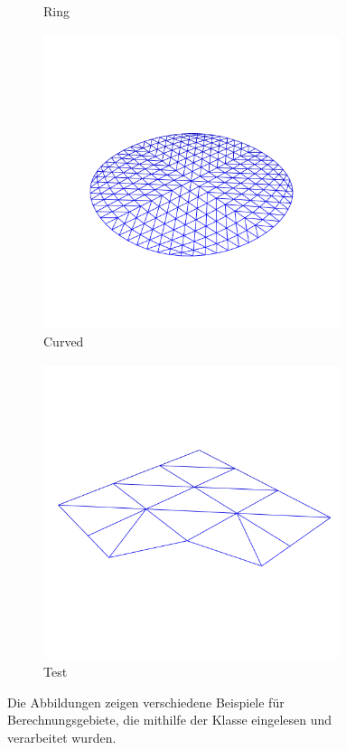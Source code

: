 \documentclass[crop=false,10pt,ngerman]{standalone}
\begin{document}
\begin{figure}
\begin{subfigure}[b]{0.24\textwidth}
          \caption{Ring}
        \end{subfigure}
        \begin{subfigure}[b]{0.24\textwidth}
          \center
          \includegraphics[trim={0 0 0 2cm},clip,width=0.95\textwidth]{images/model-circle-0.png}
          \caption{Curved}
        \end{subfigure}
        \begin{subfigure}[b]{0.24\textwidth}
          \center
          \includegraphics[trim={0 0 0 2cm},clip,width=0.95\textwidth]{images/model-test-0.png}
          \caption{Test}
        \end{subfigure}
        \caption[Beispiele verschiedener Berechnungsgebiete]{%
          Die Abbildungen zeigen verschiedene Beispiele für Berechnungsgebiete, die mithilfe der Klasse  eingelesen und verarbeitet wurden.
        }
        \label{fig:model-examples}
      \end{figure}
\end{document}
